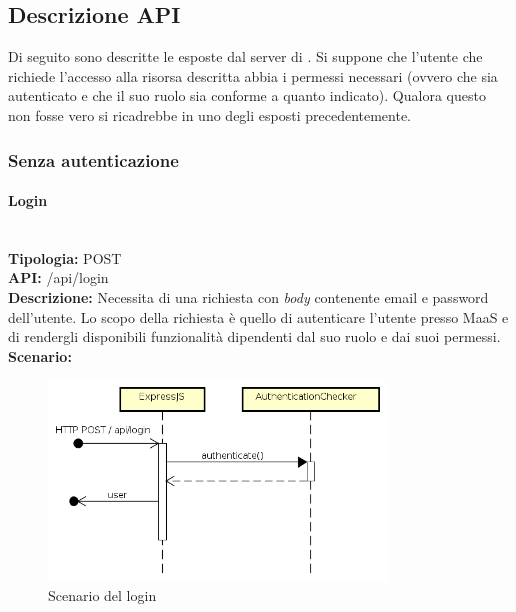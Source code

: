 \subsection{Descrizione API}
Di seguito sono descritte le   esposte dal server di . Si suppone che l'utente che richiede l'accesso alla risorsa descritta abbia i permessi necessari (ovvero che sia autenticato e che il suo ruolo sia conforme a quanto indicato). Qualora questo non fosse vero si ricadrebbe in uno degli  esposti precedentemente.
\subsubsection{Senza autenticazione}
\paragraph{Login}\mbox{}\\
\textbf{Tipologia:} POST \\
\textbf{API:} /api/login \\
\textbf{Descrizione:} Necessita di una richiesta con \textit{body} contenente email e password dell'utente. Lo scopo della richiesta è quello di autenticare l'utente presso MaaS e di rendergli disponibili funzionalità dipendenti dal suo ruolo e dai suoi permessi. \\
\textbf{Scenario:} 
\begin{figure}[H]
\centering
\includegraphics[width=0.8\textwidth]{res/sections/backend/sequence/(POST)login.png}
\caption{Scenario del login}
\end{figure}

\newpage
